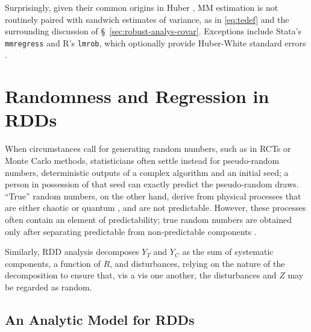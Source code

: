 Surprisingly, given their common origins in %
Huber \citeyearpar{huber1964robust}, MM estimation is not routinely
paired with sandwich estimates of variance, as in \eqref{eq:tedef} and
the surrounding discussion of \S~\ref{sec:robust-analys-covar}.
Exceptions include Stata's \texttt{mmregress} and R's \texttt{lmrob},
which optionally provide Huber-White standard errors
\citep{verardiCroux2009robust,rousseuwetal2015robustbase}.


\section{Randomness and Regression in RDDs}\label{sec:theMethod}


When circumstances call for generating random numbers, such as in
RCTs or Monte Carlo methods, statisticians often settle instead for
pseudo-random numbers, deterministic
outputs of a complex algorithm and an initial seed; a person in
possession of that seed can exactly predict the pseudo-random draws.
``True'' random numbers, on the other hand, derive from physical
processes that are either chaotic \citep[e.g.][]{uchida2008fast} or
quantum \citep[e.g.][]{stefanov2000optical}, and are not
predictable.  However, these processes often contain an element
of predictability; %
true random
numbers are obtained only after separating predictable from
non-predictable components \citep[see, e.g.][]{Nisan1999148}.%

Similarly, RDD analysis decomposes $Y_{T}$ and $Y_C$ as the sum of systematic
components, a function of $R$, and disturbances, relying on the nature of the decomposition to ensure
that, vis a vis one another, the disturbances and $Z$ may
be regarded as random.

\subsection{An Analytic Model for RDDs} \label{sec:model-eey-c-r}

